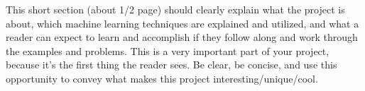 This short section (about 1/2 page) should clearly explain what the project is about, which machine learning techniques are explained and utilized, and what a reader can expect to learn and accomplish if they follow along and work through the examples and problems. This is a very important part of your project, because it’s the first thing the reader sees. Be clear, be concise, and use this opportunity to convey what makes this project interesting/unique/cool.